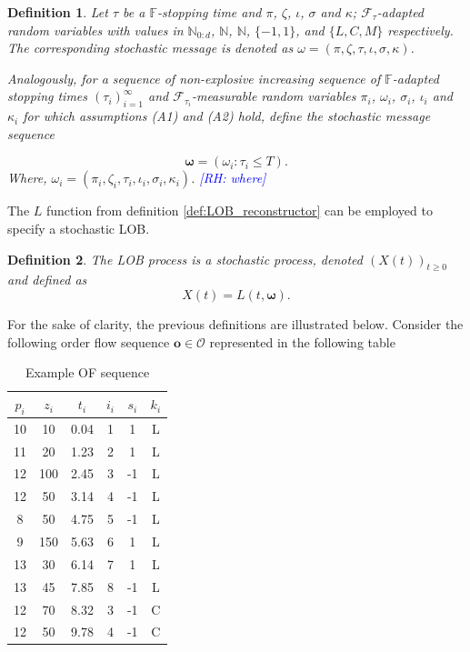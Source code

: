 \documentclass[10pt,a4paper,oneside]{article}
\newcommand{\N}{\mathbb{N}}
\newcommand{\Fil}{\mathbb{F}}
\newcommand{\SigAl}{\mathcal{F}}
\newcommand{\rh}[1]{\textcolor{blue}{\textsf{[RH: #1]}}}
\newtheorem{definition}{Definition}
\begin{document}
\begin{definition}
Let $\tau$ be a $\Fil$-stopping time and $\pi$, $\zeta$, $\iota$, $\sigma$ and $\kappa$; $\SigAl_{\tau}$-adapted random variables with values in $\N_{0:d}$, $\N$, $\N$, $\{-1, 1\}$, and $\{L, C, M\}$ respectively. The corresponding stochastic message is denoted as  $\omega = (\pi, \zeta, \tau, \iota, \sigma, \kappa)$.

Analogously, for a sequence of non-explosive increasing sequence of $\Fil$-adapted stopping times $(\tau_i)^{\infty}_{i = 1}$ and $\SigAl_{\tau_i}$-measurable random variables $\pi_i$, $\omega_i$, $\sigma_i$, $\iota_i$ and $\kappa_i$ for which assumptions (A1) and (A2) hold, define the stochastic message sequence

\begin{equation*}
\boldsymbol{\omega} = (\omega_i : \tau_i \leq T).
\end{equation*}
Where, $\omega_i = (\pi_i, \zeta_i, \tau_i, \iota_i, \sigma_i, \kappa_i)$. \rh{where} 
\label{def:stochastic_messages}
\end{definition}

The $L$ function from definition \ref{def:LOB_reconstructor} can be employed to specify a stochastic LOB.

\begin{definition} The LOB process is a stochastic process, denoted $(X(t))_{t \geq 0}$ and defined as
\begin{equation*}
X(t) = L(t, \boldsymbol{\omega}).
\end{equation*}
\label{def:lob_process}
\end{definition}

For the sake of clarity, the previous definitions are illustrated below. Consider the following order flow sequence $\mathbf{o} \in \mathcal{O}$ represented in the following table

\begin{table}[H]
\centering
\begin{tabular}{cccccc}
\hline
$p_i$ & $z_i$ & $t_i$ & $i_i$ & $s_i$ & $k_i$ \\ \hline
10    & 10   & 0.04      & 1          & 1    & L    \\
11    & 20   & 1.23      & 2          & 1    & L    \\
12    & 100  & 2.45      & 3          & -1   & L    \\
12    & 50   & 3.14      & 4          & -1   & L    \\
8     & 50   & 4.75      & 5          & -1   & L    \\
9     & 150  & 5.63      & 6          & 1    & L    \\
13    & 30   & 6.14      & 7          & 1    & L    \\
13    & 45   & 7.85      & 8          & -1   & L    \\
12    & 70   & 8.32      & 3          & -1   & C    \\
12    & 50   & 9.78      & 4          & -1   & C    \\ \hline
\end{tabular}
\caption{Example OF sequence}
\label{tab:of_example}
\end{table}
\end{document}
